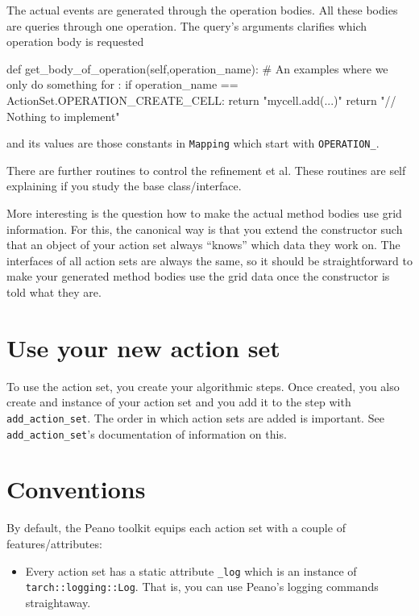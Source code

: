 \noindent
The actual events are generated through the operation bodies.
All these bodies are queries through one operation. 
The query's arguments clarifies which operation body is requested

\begin{code}
  def get_body_of_operation(self,operation_name):
    # An examples where we only do something for :
    if operation_name == ActionSet.OPERATION_CREATE_CELL:
      return "mycell.add(...)\n"
    return "// Nothing to implement\n"
\end{code}

\noindent
and its values are those constants in \texttt{Mapping} which start with
\texttt{OPERATION\_}.


There are further routines to control the refinement et al.
These routines are self explaining if you study the base class/interface.


More interesting is the question how to make the actual method bodies use grid
information.
For this, the canonical way is that you extend the constructor such that an
object of your action set always ``knows'' which data they work on. 
The interfaces of all action sets are always the same, so it should be
straightforward to make your generated method bodies use the grid data once the
constructor is told what they are.


\section{Use your new action set}

To use the action set, you create your algorithmic steps.
Once created, you also create and instance of your action set and you add it to the
step with \texttt{add\_action\_set}.
The order in which action sets are added is important.
See \texttt{add\_action\_set}'s documentation of information on this.



\section{Conventions}

By default, the Peano toolkit equips each action set with a couple of
features/attributes:

\begin{itemize}
  \item Every action set has a static attribute \texttt{\_log} which is an instance
  of \texttt{tarch::logging::Log}. That is, you can use Peano's logging commands
  straightaway.
\end{itemize}

